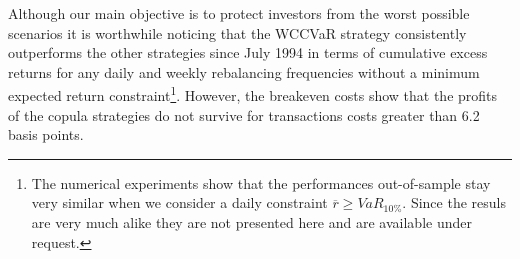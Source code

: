 \documentclass[a4paper,10pt]{article}
\begin{document}
Although our main objective is to protect investors from the worst possible scenarios it is worthwhile noticing that the WCCVaR strategy consistently outperforms the other strategies since July 1994 in terms of cumulative excess returns for any daily and weekly rebalancing frequencies without a minimum expected return constraint\footnote{The numerical experiments show that the performances out-of-sample stay very similar when we consider a daily constraint $\overline{r}{\geq }VaR_{10\%}$. Since the resuls are very much alike they are not presented here and are available under request.}. However, the breakeven costs show that the profits of the copula strategies do not survive for transactions costs greater than 6.2 basis points.

\vspace{0.1cm}
\end{document}
